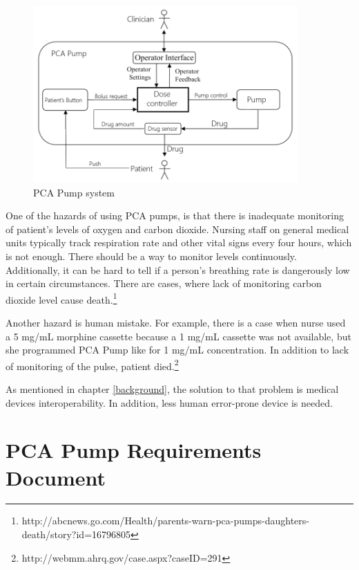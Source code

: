 \begin{figure}[ht]%
    \begin{center}
    	\includegraphics[width=0.9\textwidth]{figures/pca-pump-system.png}    	
    \end{center}
    \caption{PCA Pump system}
    \label{figure:pca-pump-system}
\end{figure}

One of the hazards of using PCA pumps, is that there is inadequate monitoring of patient's levels of oxygen and carbon dioxide. Nursing staff on general medical units typically track respiration rate and other vital signs every four hours, which is not enough. There should be a way to monitor levels continuously. Additionally, it can be hard to tell if a person's breathing rate is dangerously low in certain circumstances. There are cases, where lack of monitoring carbon dioxide level cause death.\footnote{http://abcnews.go.com/Health/parents-warn-pca-pumps-daughters-death/story?id=16796805} 

Another hazard is human mistake. For example, there is a case when nurse used a 5 mg/mL morphine cassette because a 1 mg/mL cassette was not available, but she programmed PCA Pump like for 1 mg/mL concentration. In addition to lack of monitoring of the pulse, patient died.\footnote{http://webmm.ahrq.gov/case.aspx?caseID=291}

As mentioned in chapter \ref{background}, the solution to that problem is medical devices interoperability. In addition, less human error-prone device is needed. 



\section{PCA Pump Requirements Document}
\label{pcapump:requirements-doc}


